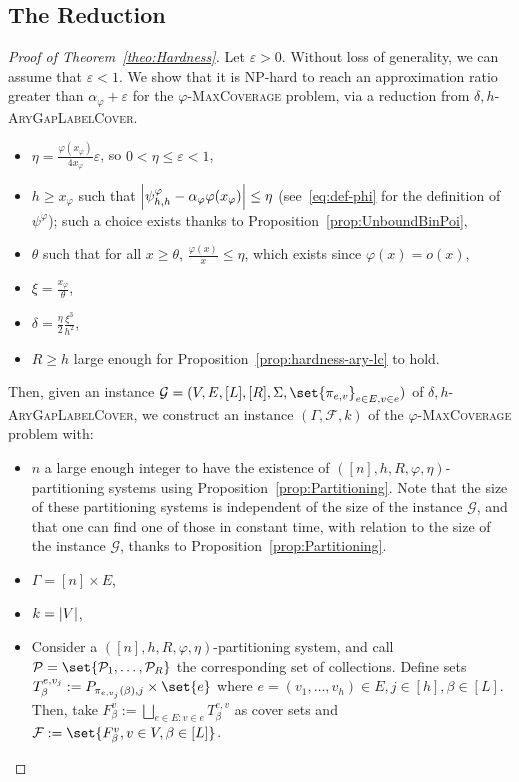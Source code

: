 \subsection{The Reduction}
  \begin{proof}[Proof of Theorem~\ref{theo:Hardness}]
    Let $\varepsilon > 0$. Without loss of generality, we can assume that $\varepsilon < 1$. We show that it is NP-hard to reach an approximation ratio greater than $\alpha_{\varphi} + \varepsilon$ for the $\varphi$-\textsc{MaxCoverage} problem, via a reduction from $\delta,h$-\textsc{AryGapLabelCover}.
  \begin{itemize}
    \item $\eta = \frac{\varphi(x_{\varphi})}{4x_{\varphi}} \varepsilon$, so $0 < \eta \leq \varepsilon < 1$,
    \item $h \geq x_{\varphi}$ such that $\abs{\psi^{\varphi}_{h,h} - \alpha_{\varphi}\varphi(x_{\varphi})} \leq \eta$ (see~\eqref{eq:def-phi} for the definition of $\psi^{\varphi}$); such a choice exists thanks to Proposition~\ref{prop:UnboundBinPoi},
    \item $\theta$ such that for all $x \geq \theta$, $\frac{\varphi(x)}{x} \leq \eta$, which exists since $\varphi(x) = o(x)$,
    \item $\xi = \frac{x_{\varphi}}{\theta}$,
    \item $\delta = \frac{\eta}{2} \frac{\xi^3}{h^2}$,
    \item $R \geq h$ large enough for Proposition~\ref{prop:hardness-ary-lc} to hold.
\end{itemize}
    
Then, given an instance  $\mathcal{G} = (V,E,[L],[R], \Sigma, \set{\pi_{e,v}}_{e \in E, v \in e})$ of $\delta,h$-\textsc{AryGapLabelCover}, we construct an instance $(\Gamma, \mathcal{F}, k)$ of the $\varphi$-\textsc{MaxCoverage} problem with:

    \begin{itemize}
    \item $n$ a large enough integer to have the existence of $([n],h,R,\varphi,\eta)$-partitioning systems using Proposition~\ref{prop:Partitioning}. Note that the size of these partitioning systems is independent of the size of the instance $\mathcal{G}$, and that one can find one of those in constant time, with relation to the size of the instance $\mathcal{G}$, thanks to Proposition~\ref{prop:Partitioning}.
    \item $\Gamma = [n] \times E$,
    \item $k =\abs{V}$,
    \item Consider a  $([n],h,R,\varphi,\eta)$-partitioning system, and call $\mathcal{P} =\set{\mathcal{P}_1,\ldots,\mathcal{P}_R}$ the corresponding set of collections. Define sets $T_{\beta}^{e,v_j} := P_{\pi_{e,v_j}(\beta),j} \times \set{e}$ where ${e = (v_1,\ldots,v_h)} \in E, j \in [h], \beta \in [L]$. Then, take $F^v_{\beta} := \bigsqcup_{e \in E:v \in e} T^{e,v}_{\beta}$ as cover sets and $\mathcal{F} := \set{F^v_{\beta}, v \in V, \beta \in [L]}$.
  \end{itemize}


\end{proof}
